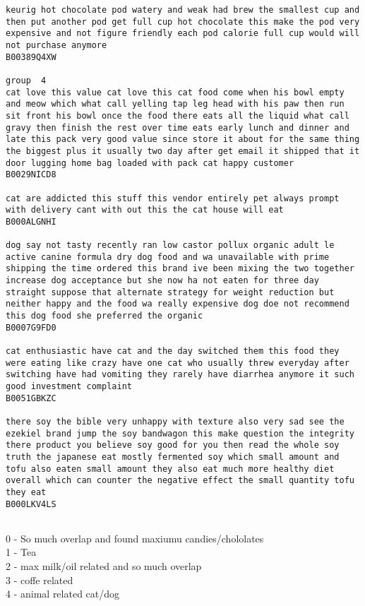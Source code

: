 \documentclass[11pt]{article}
\begin{document}
\begin{Verbatim}[commandchars=\\\{\}]
keurig hot chocolate pod watery and weak had brew the smallest cup and then put another pod get full cup hot chocolate this make the pod very expensive and not figure friendly each pod calorie full cup would will not purchase anymore
B00389Q4XW

group  4
cat love this value cat love this cat food come when his bowl empty and meow which what call yelling tap leg head with his paw then run sit front his bowl once the food there eats all the liquid what call gravy then finish the rest over time eats early lunch and dinner and late this pack very good value since store it about for the same thing the biggest plus it usually two day after get email it shipped that it door lugging home bag loaded with pack cat happy customer
B0029NICD8

cat are addicted this stuff this vendor entirely pet always prompt with delivery cant with out this the cat house will eat
B000ALGNHI

dog say not tasty recently ran low castor pollux organic adult le active canine formula dry dog food and wa unavailable with prime shipping the time ordered this brand ive been mixing the two together increase dog acceptance but she now ha not eaten for three day straight suppose that alternate strategy for weight reduction but neither happy and the food wa really expensive dog doe not recommend this dog food she preferred the organic
B0007G9FD0

cat enthusiastic have cat and the day switched them this food they were eating like crazy have one cat who usually threw everyday after switching have had vomiting they rarely have diarrhea anymore it such good investment complaint
B0051GBKZC

there soy the bible very unhappy with texture also very sad see the ezekiel brand jump the soy bandwagon this make question the integrity there product you believe soy good for you then read the whole soy truth the japanese eat mostly fermented soy which small amount and tofu also eaten small amount they also eat much more healthy diet overall which can counter the negative effect the small quantity tofu they eat
B000LKV4LS


    \end{Verbatim}

    0 - So much overlap and found maxiumu candies/chololates\\
1 - Tea\\
2 - max milk/oil related and so much overlap\\
3 - coffe related\\
4 - animal related cat/dog
\end{document}
